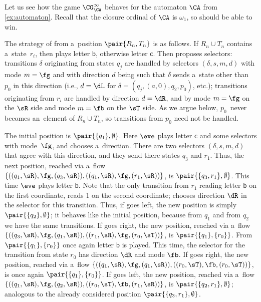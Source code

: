 \begin{exa}
	Let us see how the game $\CG^\infty_\CA$ behaves for the automaton $\CA$ from \cref{ex:automaton}.
	Recall that the closure ordinal of $\CA$ is $\omega_1$, so \eve should be able to win.
	
	The strategy of \eve from a~position $\pair{R_n,T_n}$ is as follows.
	If $R_n\cup T_n$ contains a~state~$r_i$, then \eve plays letter $\mathsf{b}$, otherwise letter $\mathsf{c}$.
	Then \eve proposes selectors:
	transitions $\delta$ originating from states $q_j$ are handled by selectors $(\delta,s,m,d)$ with mode $m=\fg$
	and with direction $d$ being such that $\delta$ sends a~state other than $p_0$ in this direction (i.e., $d=\dL$ for $\delta=(q_j,(a,0),q_2,p_0)$, etc.);
	transitions originating from $r_i$ are handled by direction $d=\dR$, and by mode $m=\fg$ on the $\sR$ side and mode $m=\fb$ on the $\sT$ side.
	As we argue below, $p_0$~never becomes an~element of $R_n\cup T_n$, so transitions from $p_0$ need not be handled.
	
	The initial position is $\pair{\{q_1\},\emptyset}$.
	Here $\eve$ plays letter $\mathsf{c}$ and some selectors with mode~$\fg$, and \adam chooses a~direction.
	There are two selectors $(\delta,s,m,d)$ that agree with this direction, and they send there states $q_3$ and $r_1$.
	Thus, the next position, reached via a~flow $\{((q_1,\sR),\fg,(q_3,\sR)),((q_1,\sR),\fg,(r_1,\sR))\}$, is $\pair{\{q_3,r_1\},\emptyset}$.
	This time $\eve$ plays letter $\mathsf{b}$.
	Note that the only transition from $r_1$ reading letter $\mathsf{b}$ on the first coordinate, reads $1$ on the second coordinate; \eve chooses direction $\dR$ in the selector for this transition.
	Thus, if \adam goes left, the new position is simply $\pair{\{q_2\},\emptyset}$; it behaves like the initial position, because from $q_1$ and from $q_2$ we have the same transitions.
	If \adam goes right, the new position, reached via a~flow $\{((q_3,\sR),\fg,(q_1,\sR)),((r_1,\sR),\fg,(r_0,\sT))\}$, is $\pair{\{q_1\},\{r_0\}}$.
	From $\pair{\{q_1\},\{r_0\}}$ once again letter $\mathsf{b}$ is played.
	This time, the selector for the transition from state $r_0$ has direction $\dR$ and mode $\fb$.
	If \adam goes right, the new position, reached via a~flow $\{((q_1,\sR),\fg,(q_1,\sR)),((r_0,\sT),\fb,(r_0,\sT))\}$, is once again $\pair{\{q_1\},\{r_0\}}$.
	If \adam goes left, the new position, reached via a~flow $\{((q_1,\sR),\fg,(q_2,\sR)),((r_0,\sT),\fb,(r_1,\sR))\}$, is $\pair{\{q_2,r_1\},\emptyset}$;
	analogous to the already considered position $\pair{\{q_3,r_1\},\emptyset}$.


\end{exa}
